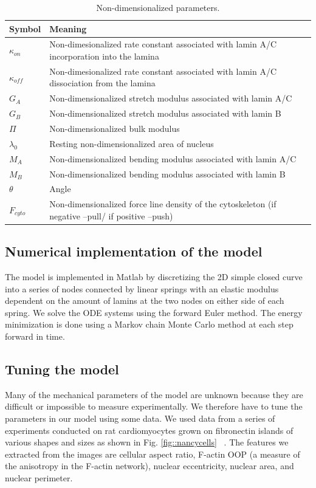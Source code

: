 \begin{table}[t!]
\caption{Non-dimensionalized parameters.}\centering \label{tab:nondimpar} 
\begin{tabular}{ l  l}
\hline
Symbol  & Meaning \\
\hline
$\kappa_{on}$ &  Non-dimesionalized rate constant associated with lamin A/C incorporation into the lamina\\
$\kappa_{off}$ &  Non-dimesionalized rate constant associated with lamin A/C dissociation from the lamina\\
$G_A$ & Non-dimensionalized stretch modulus associated with lamin A/C \\
$G_B$ &  Non-dimensionalized stretch modulus associated with lamin B\\
$\Pi$ &  Non-dimensionalized bulk modulus \\
$\lambda_0$ & Resting non-dimensionalized area of nucleus\\
$M_A$ & Non-dimensionalized bending modulus associated with lamin A/C\\
$M_B$  & Non-dimensionalized bending modulus associated with lamin B\\
$\theta$ & Angle   \\
$F_{cyto}$ &  Non-dimensionalized force line density of the cytoskeleton (if negative --pull/ if positive --push) \\
\hline
\end{tabular}
\end{table}


\subsection{Numerical implementation of the model}

The model is implemented in Matlab by discretizing the 2D simple closed curve into a series of nodes connected by linear springs with an elastic modulus dependent on the amount of lamins at the two nodes on either side of each spring. We solve the ODE systems using the forward Euler method. The energy minimization is done using a Markov chain Monte Carlo method at each step forward in time. 

\subsection{Tuning the model}

Many of the mechanical parameters of the model are unknown because they are difficult or impossible to measure experimentally. We therefore have to tune the parameters in our model using some data. We used data from a series of experiments conducted on rat cardiomyocytes grown on fibronectin islands of various shapes and sizes as shown in Fig. \ref{fig::nancycells} ~\cite{Drew2016}. The features we extracted from the images are cellular aspect ratio, F-actin OOP (a measure of the anisotropy in the F-actin network), nuclear eccentricity, nuclear area, and nuclear perimeter. 

